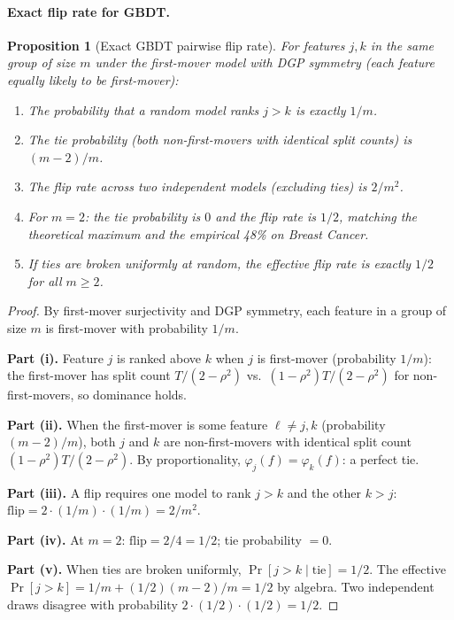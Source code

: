 \documentclass{article}
\newtheorem{proposition}[theorem]{Proposition}
\begin{document}
\paragraph{Exact flip rate for GBDT.}
\begin{proposition}[Exact GBDT pairwise flip rate]
\label{prop:exact-flip}
For features $j, k$ in the same group of size $m$ under the first-mover model with DGP symmetry (each feature equally likely to be first-mover):
\begin{enumerate}
    \item[(i)] The probability that a random model ranks $j > k$ is exactly $1/m$.
    \item[(ii)] The tie probability (both non-first-movers with identical split counts) is $(m-2)/m$.
    \item[(iii)] The flip rate across two independent models (excluding ties) is $2/m^2$.
    \item[(iv)] For $m = 2$: the tie probability is $0$ and the flip rate is $1/2$, matching the theoretical maximum and the empirical 48\% on Breast Cancer.
    \item[(v)] If ties are broken uniformly at random, the effective flip rate is exactly $1/2$ for all $m \geq 2$.
\end{enumerate}
\end{proposition}

\begin{proof}
By first-mover surjectivity and DGP symmetry, each feature in a group of size $m$ is first-mover with probability $1/m$.

\textbf{Part (i).} Feature $j$ is ranked above $k$ when $j$ is first-mover (probability $1/m$): the first-mover has split count $T/(2-\rho^2)$ vs.\ $(1-\rho^2)T/(2-\rho^2)$ for non-first-movers, so dominance holds.

\textbf{Part (ii).} When the first-mover is some feature $\ell \neq j, k$ (probability $(m-2)/m$), both $j$ and $k$ are non-first-movers with identical split count $(1-\rho^2)T/(2-\rho^2)$. By proportionality, $\varphi_j(f) = \varphi_k(f)$: a perfect tie.

\textbf{Part (iii).} A flip requires one model to rank $j > k$ and the other $k > j$: $\text{flip} = 2 \cdot (1/m) \cdot (1/m) = 2/m^2$.

\textbf{Part (iv).} At $m=2$: $\text{flip} = 2/4 = 1/2$; tie probability $= 0$.

\textbf{Part (v).} When ties are broken uniformly, $\Pr[j > k \mid \text{tie}] = 1/2$. The effective $\Pr[j > k] = 1/m + (1/2)(m-2)/m = 1/2$ by algebra. Two independent draws disagree with probability $2 \cdot (1/2) \cdot (1/2) = 1/2$.
\end{proof}
\end{document}
